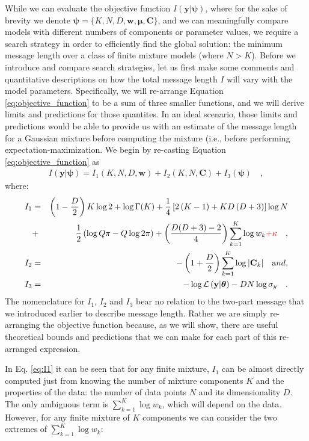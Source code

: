\documentclass{elsarticle}
\newcommand{\todo}[1]{\textcolor{red}{#1}}
\newcommand{\vect}[1]{\boldsymbol{\mathbf{#1}}}
\renewcommand{\vec}[1]{\vect{#1}}
\def\cov{C}
\def\veccov{\vect{\cov}}
\def\vecmean{\vect{\mu}}
\def\weight{w}
\def\datum{y}
\def\data{\vect{\datum}}
\def\likelihood{\mathcal{L}}
\begin{document}
While we can evaluate the objective function $I(\vec{\data}|\vec{\psi})$, where 
for the sake of brevity we denote $\vec{\psi} = \{K, N, D, \vec{\weight}, 
\vecmean, \veccov\}$, and we can meaningfully compare models with different numbers of components or parameter
values, we require a search strategy in order to efficiently find the global
solution: the minimum message length over a class of finite mixture models
(where $N > K$). Before we introduce and compare search strategies,
let us first make some comments and quantitative descriptions on how the
total message length $I$ will vary with the model parameters. Specifically, we
will re-arrange Equation \ref{eq:objective_function} to be a sum of three 
smaller functions, and we will derive limits and predictions for those 
quantites. In an ideal scenario, those limits and predictions would be able
to provide us with an estimate of the message length for a Gaussian mixture
before computing the mixture (i.e., before performing expectation-maximization.
We begin by re-casting Equation \ref{eq:objective_function} as
\begin{eqnarray}
I(\vec{\data}|\vec{\psi}) = I_{1}(K, N, D, \vec{\weight}) 
                          + I_{2}(K, N, \veccov)
                          + I_{3}(\vec{\psi}) \quad ,
\end{eqnarray}
\noindent{}where:
\begin{eqnarray}
    I_{1} &=& \left(1-\frac{D}{2}\right)K\log{2} + \log{\Gamma(K)} + \frac{1}{4}\left[2\left(K - 1\right) + KD\left(D+3\right)\right]\log{N} \nonumber \\
          &+& \frac{1}{2}\left(\log{Q\pi} - Q\log{2\pi}\right) + \left(\frac{D(D+3) - 2}{4}\right)\sum_{k=1}^{K}\log{\weight_k} \todo{+ \kappa} \quad , \label{eq:I1} \\
    I_{2} &=& -\left(1 + \frac{D}{2}\right)\sum_{k=1}^{K}\log{|\veccov_k|} \quad {\textrm and},\\
    I_{3} &=& -\log\likelihood\left(\vec{\data}|\vec{\theta}\right) - DN\log{\sigma_{\datum}} \quad .
\end{eqnarray}
The nomenclature for $I_1$, $I_2$ and $I_3$ bear no relation to the two-part 
message that we introduced earlier to describe message length. Rather we are
simply re-arranging the objective function because, as we will show, there are
useful theoretical bounds and predictions that we can make for each part of
this re-arranged expression.

In Eq. \ref{eq:I1} it can be seen that for any finite mixture, $I_1$ can be
almost directly computed just from knowing the number of mixture components
$K$ and the properties of the data: the number of data points $N$ and its
dimensionality $D$. The only ambiguous term is $\sum_{k=1}^{K}\log\weight_k$,
which will depend on the data. However, for any finite mixture of $K$
components we can consider the two extremes of $\sum_{k=1}^{K}\log\weight_k$:
\end{document}
